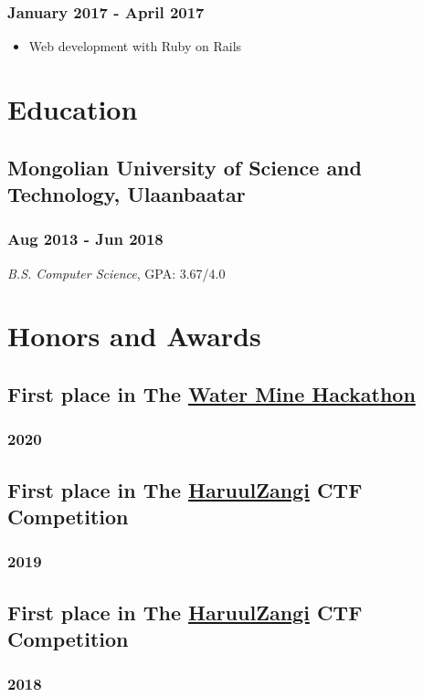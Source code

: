 \documentclass[letterpaper]{article}
\begin{document}
\subsubsection{January 2017 - April 2017}
\label{sec:org773c467}
\begin{itemize}
\item Web development with Ruby on Rails
\end{itemize}
\section{Education}
\label{sec:orgff617cf}
\subsection{Mongolian University of Science and Technology, Ulaanbaatar}
\label{sec:orge946c14}
\subsubsection{Aug 2013 - Jun 2018}
\label{sec:org7719f94}
\emph{B.S. Computer Science}, GPA: 3.67/4.0
\section{Honors and Awards}
\label{sec:orge5364d1}
\subsection{First place in The \href{https://www.unread.today/c/2191}{Water Mine Hackathon}}
\label{sec:org0c6ec3b}
\subsubsection{2020}
\label{sec:orge07b9dd}
\subsection{First place in The \href{http:www.haruulzangi.mn}{HaruulZangi} CTF Competition}
\label{sec:org93cb6a4}
\subsubsection{2019}
\label{sec:org9c2b7a4}
\subsection{First place in The \href{http:www.haruulzangi.mn}{HaruulZangi} CTF Competition}
\label{sec:orgf7d04e0}
\subsubsection{2018}
\label{sec:orge4eefe3}
\end{document}
